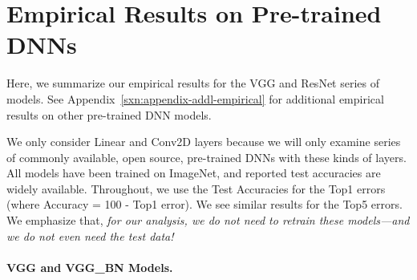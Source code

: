 \vspace{-2mm}

\section{Empirical Results on Pre-trained DNNs}
\label{sxn:emp}

\vspace{-1mm}

Here, we summarize our empirical results for the VGG and ResNet series of models.
See Appendix~\ref{sxn:appendix-addl-empirical} for additional empirical results on other pre-trained DNN models.

We only consider Linear and Conv2D layers because we will only examine series of commonly available, open source, pre-trained DNNs with these kinds of layers. 
All models have been trained on ImageNet, and reported test accuracies are widely available. 
Throughout, we use the Test Accuracies for the Top1 errors (where Accuracy = 100 - Top1 error).
We see similar results for the Top5 errors.
We emphasize that, \emph{for our analysis, we do not need to retrain these models---and we do not even need the test data!}

\paragraph{VGG and VGG\_BN Models.}

